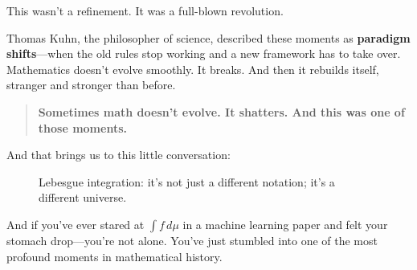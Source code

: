 This wasn’t a refinement. It was a full-blown revolution.

Thomas Kuhn, the philosopher of science, described these moments as \textbf{paradigm shifts}—when the old rules stop working and a new framework has to take over. Mathematics doesn’t evolve smoothly. It breaks. And then it rebuilds itself, stranger and stronger than before.

\begin{quote}
\textbf{Sometimes math doesn’t evolve. It shatters. And this was one of those moments.}
\end{quote}

And that brings us to this little conversation:

\begin{figure}[H]
\centering
{}
\caption{Lebesgue integration: it’s not just a different notation; it’s a different universe.}
\end{figure}

And if you’ve ever stared at \( \int f \, d\mu \) in a machine learning paper and felt your stomach drop—you’re not alone. You’ve just stumbled into one of the most profound moments in mathematical history.



